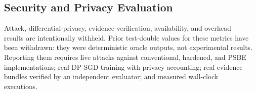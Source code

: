\subsection{Security and Privacy Evaluation}

Attack, differential-privacy, evidence-verification, availability, and
overhead results are intentionally withheld. Prior test-double values for
these metrics have been withdrawn: they were deterministic oracle outputs,
not experimental results. Reporting them requires live attacks against
conventional, hardened, and PSBE implementations; real DP-SGD training with
privacy accounting; real evidence bundles verified by an independent
evaluator; and measured wall-clock executions.
